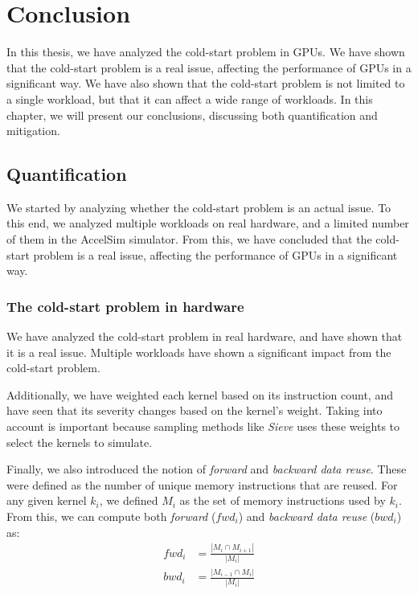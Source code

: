 \chapter{Conclusion}\label{ch:conclusion}

In this thesis, we have analyzed the cold-start problem in GPUs.
We have shown that the cold-start problem is a real issue, affecting the performance of GPUs in a significant way.
We have also shown that the cold-start problem is not limited to a single workload, but that it can affect a wide range of workloads.
In this chapter, we will present our conclusions, discussing both quantification and mitigation.

\section{Quantification}\label{sec:quantification}
We started by analyzing whether the cold-start problem is an actual issue.
To this end, we analyzed multiple workloads on real hardware, and a limited number of them in the AccelSim simulator.
From this, we have concluded that the cold-start problem is a real issue, affecting the performance of GPUs in a significant way.

\subsection{The cold-start problem in hardware}\label{subsec:cold-start-in-hardware}
We have analyzed the cold-start problem in real hardware, and have shown that it is a real issue.
Multiple workloads have shown a significant impact from the cold-start problem.

Additionally, we have weighted each kernel based on its instruction count, and have seen that its severity changes based on the kernel's weight.
Taking into account is important because sampling methods like \textit{Sieve} uses these weights to select the kernels to simulate.

Finally, we also introduced the notion of \textit{forward} and \textit{backward data reuse}.
These were defined as the number of unique memory instructions that are reused.
For any given kernel $k_i$, we defined $M_i$ as the set of memory instructions used by $k_i$.
From this, we can compute both \textit{forward} ($fwd_i$) and \textit{backward data reuse} ($bwd_i$) as:
\begin{align}
    fwd_i &= \frac{|M_i \cap M_{i+1}|}{|M_i|} \\
    bwd_i &= \frac{|M_{i-1} \cap M_i|}{|M_i|}
\end{align}

